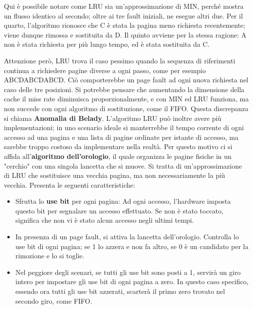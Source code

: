 \noindent Qui è possibile notare come LRU sia un'approssimazione di MIN, perché mostra un flusso identico al secondo; oltre ai tre fault iniziali, ne
esegue altri due. Per il quarto, l'algoritmo rionosce che C è stata la pagina meno richiesta recentemente; viene dunque rimossa e sostituita da D.
Il quinto avviene per la stessa ragione: A non è stata richiesta per più lungo tempo, ed è stata sostituita da C.\par
Attenzione però, LRU trova il caso pessimo quando la sequenza di riferimenti continua a richiedere pagine diverse a ogni passo, come per esempio
ABCDABCDABCD. Ciò comporterebbe un page fault ad ogni nuova richiesta nel caso delle tre posizioni. Si potrebbe pensare che aumentando la dimensione
della cache il miss rate diminuisca proporzionalmente, e con MIN ed LRU funziona, ma non succede con ogni algoritmo di sostituzione, come il FIFO.
Questa discrepanza si chiama \textbf{Anomalia di Belady}. L'algoritmo LRU può inoltre avere più implementazioni; in uno scenario ideale si manterrebbe
il tempo corrente di ogni accesso ad una pagina e una lista di pagine ordinate per istante di accesso, ma sarebbe troppo costoso da implementare nella
realtà. Per questo motivo ci si affida all'\textbf{algoritmo dell'orologio}, il quale organizza le pagine fisiche in un "cerchio" con una singola
lancetta che si muove. Si tratta di un'approssimazione di LRU che sostituisce una vecchia pagina, ma non necessariamente la più vecchia. Presenta le
seguenti caratteristiche: \begin{itemize}
    \item Sfrutta lo \textbf{use bit} per ogni pagina: Ad ogni accesso, l'hardware imposta questo bit per segnalare un accesso effettuato. Se non è
    stato toccato, significa che non vi è stato alcun accesso negli ultimi tempi.
    \item In presenza di un page fault, si attiva la lancetta dell'orologio. Controlla lo use bit di ogni pagina; se 1 lo azzera e non fa altro, se 0 è
    un candidato per la rimozione e lo si toglie.
    \item Nel peggiore degli scenari, se tutti gli use bit sono posti a 1, servirà un giro intero per impostare gli use bit di ogni pagina a zero. In
    questo caso specifico, essendo ora tutti gli use bit azzerati, scarterà il primo zero trovato nel secondo giro, come FIFO.
\end{itemize}

